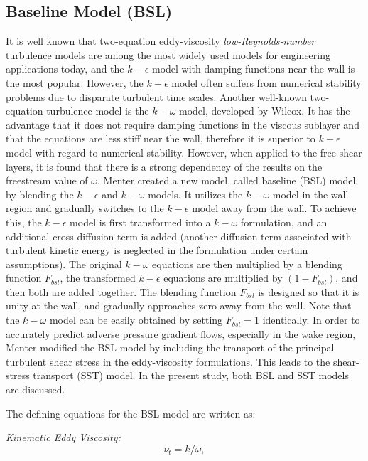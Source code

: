 \subsection{Baseline Model (BSL)}

It is well known that two-equation eddy-viscosity
{\sl low-Reynolds-number\/} turbulence models are among the most widely
used models for engineering applications today, and the $k-\epsilon$
model with damping functions near the wall is the most popular.
However, the $k-\epsilon$ model often suffers from numerical stability
problems due to disparate turbulent time scales.  Another well-known
two-equation turbulence model is the $k-\omega$ model, developed by
Wilcox\cite{Wilcox.88}.  It has the advantage that it does not
require damping functions in the viscous sublayer and that the
equations are less stiff near the wall, therefore it is superior to 
$k-\epsilon$ model with regard to numerical stability.  However, when
applied to the free shear layers, it is found that there is a strong
dependency of the results on the freestream value of
$\omega$\cite{Wilcox.91,Menter.92}.  Menter created a new model,
called baseline (BSL) model, by blending the $k-\epsilon$ and
$k-\omega$ models\cite{Menter.94}.  It utilizes the $k-\omega$ model
in the wall region and gradually switches to the $k-\epsilon$ model
away from the wall.  To achieve this, the $k-\epsilon$ model is first
transformed into a $k-\omega$ formulation, and an additional cross
diffusion term is added (another diffusion term associated with
turbulent kinetic energy is neglected in the formulation under certain
assumptions\cite{WilcoxBook}). The original $k-\omega$ equations are
then multiplied by a blending function $F_{bsl}$, the transformed
$k-\epsilon$ equations are multiplied by $(1-F_{bsl})$, and then both
are added together.  The blending function $F_{bsl}$ is designed so
that it is unity at the wall, and gradually approaches zero away from
the wall.  Note that the $k-\omega$ model can be easily obtained by
setting $F_{bsl} = 1$ identically.  In order to accurately predict
adverse pressure gradient flows, especially in the wake region,
Menter\cite{Menter.94} modified the BSL model by including the transport of
the principal turbulent shear stress\cite{Jon-King.85} in the
eddy-viscosity formulations. This leads to the shear-stress transport
(SST) model.  In the present study, both BSL and SST models are
discussed.

The defining equations for the BSL model are written as:

{\it Kinematic Eddy Viscosity:} 
\begin{equation}
\nu_t = k/\omega,
\end{equation}

